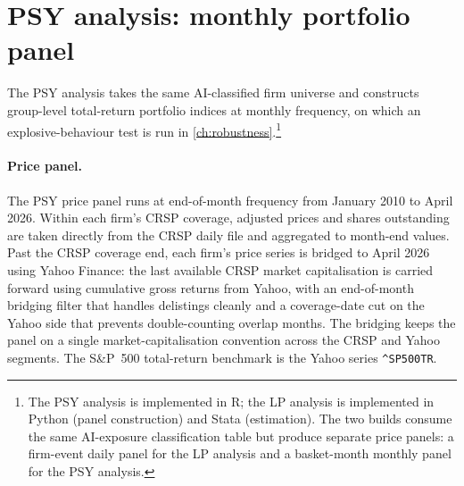 \section{PSY analysis: monthly portfolio panel}
\label{sec:psy-data}

The PSY analysis takes the same AI-classified firm universe and constructs group-level total-return portfolio indices at monthly frequency, on which an explosive-behaviour test is run in \cref{ch:robustness}.\footnote{The PSY analysis is implemented in R; the LP analysis is implemented in Python (panel construction) and Stata (estimation). The two builds consume the same AI-exposure classification table but produce separate price panels: a firm-event daily panel for the LP analysis and a basket-month monthly panel for the PSY analysis.}

\paragraph{Price panel.} The PSY price panel runs at end-of-month frequency from January 2010 to April 2026. Within each firm's CRSP coverage, adjusted prices and shares outstanding are taken directly from the CRSP daily file and aggregated to month-end values. Past the CRSP coverage end, each firm's price series is bridged to April 2026 using Yahoo Finance: the last available CRSP market capitalisation is carried forward using cumulative gross returns from Yahoo, with an end-of-month bridging filter that handles delistings cleanly and a coverage-date cut on the Yahoo side that prevents double-counting overlap months. The bridging keeps the panel on a single market-capitalisation convention across the CRSP and Yahoo segments. The S\&P~500 total-return benchmark is the Yahoo series \texttt{\^{}SP500TR}.

